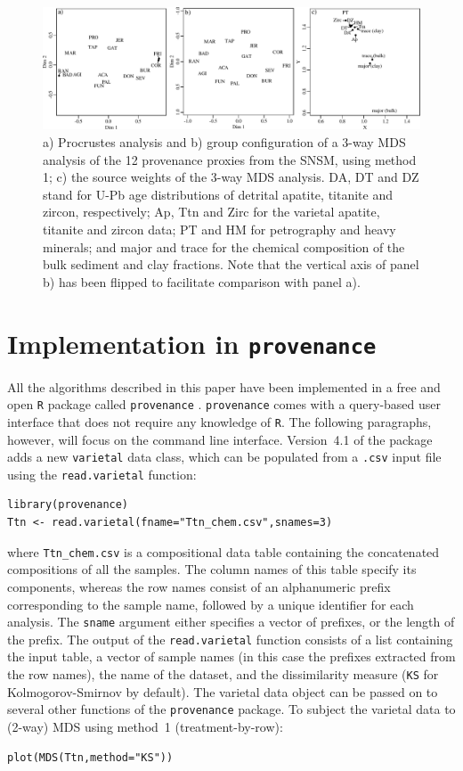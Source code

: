 \documentclass{article}
\begin{document}
\begin{figure}
\includegraphics[height=.7\textheight]{Fig5.pdf}
\caption{a) Procrustes analysis and b) group configuration of a 3-way
  MDS analysis of the 12 provenance proxies from the SNSM, using
  method 1; c) the source weights of the 3-way MDS analysis. DA, DT
  and DZ stand for U-Pb age distributions of detrital apatite,
  titanite and zircon, respectively; Ap, Ttn and Zirc for the varietal
  apatite, titanite and zircon data; PT and HM for petrography and
  heavy minerals; and major and trace for the chemical composition of
  the bulk sediment and clay fractions. Note that the vertical axis of
  panel b) has been flipped to facilitate comparison with panel a).}
\label{fig:multimethod}
\end{figure}

\section{Implementation in \texttt{provenance}}\label{sec:R}

All the algorithms described in this paper have been implemented in a
free and open \texttt{R} package called \texttt{provenance}
\cite{vermeesch2016a}. \texttt{provenance} comes with a query-based
user interface that does not require any knowledge of \texttt{R}.  The
following paragraphs, however, will focus on the command line
interface.  Version~4.1 of the package adds a new \texttt{varietal}
data class, which can be populated from a \texttt{.csv} input file
using the \texttt{read.varietal} function:

\begin{verbatim}
library(provenance)
Ttn <- read.varietal(fname="Ttn_chem.csv",snames=3)
\end{verbatim}

\noindent where \verb|Ttn_chem.csv| is a compositional data table
containing the concatenated compositions of all the samples. The
column names of this table specify its components, whereas the row
names consist of an alphanumeric prefix corresponding to the sample
name, followed by a unique identifier for each analysis. The
\texttt{sname} argument either specifies a vector of prefixes, or the
length of the prefix. The output of the \texttt{read.varietal}
function consists of a list containing the input table, a vector of
sample names (in this case the prefixes extracted from the row names),
the name of the dataset, and the dissimilarity measure (\texttt{KS}
for Kolmogorov-Smirnov by default). The varietal data object can be
passed on to several other functions of the \texttt{provenance}
package. To subject the varietal data to (2-way) MDS using method~1
(treatment-by-row):
\begin{verbatim}
plot(MDS(Ttn,method="KS"))
\end{verbatim}
\end{document}
